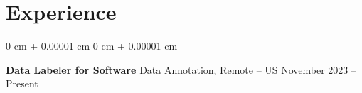 \documentclass[10pt, letterpaper]{article}
\newenvironment{highlightsforbulletentries}{
    \begin{itemize}[
        topsep=0.10 cm,
        parsep=0.10 cm,
        partopsep=0pt,
        itemsep=0pt,
        leftmargin=10pt
    ]
}{
    \end{itemize}
} %
\newenvironment{onecolentry}{
    \begin{adjustwidth}{
        0 cm + 0.00001 cm
    }{
        0 cm + 0.00001 cm
    }
}{
    \end{adjustwidth}
} %
\newenvironment{twocolentry}[2][]{
    \onecolentry
    \def\secondColumn{#2}
    \setcolumnwidth{\fill, 6.0 cm}
    \begin{paracol}{2}
}{
    \switchcolumn \raggedleft \secondColumn
    \end{paracol}
    \endonecolentry
} %
\begin{document}
%
%
%
%        
%
%
%
%
%    
%
%
%
%
%
%
%
%
    
    \section{Experience}



        
        \begin{twocolentry}{
            November 2023 – Present
        }
            \textbf{Data Labeler for Software} Data Annotation, Remote -- US\end{twocolentry}
\end{document}
